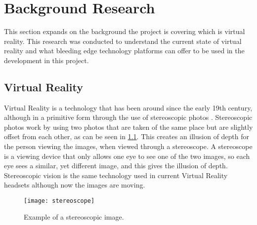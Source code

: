 \chapter{Background Research}
\label{chapter2}


This section expands on the background the project is covering which is virtual reality. This research was conducted to understand the current state of virtual reality and what bleeding edge technology platforms can offer to be used in the development in this project.

\section{Virtual Reality}
	Virtual Reality is a technology that has been around since the early 19th century, although in a primitive form through the use of stereoscopic photos \cite{stereoscopy}. Stereoscopic photos work by using two photos that are taken of the same place but are slightly offset from each other, as can be seen in \ref{fig:stereoscope1}. This creates an illusion of depth for the person viewing the images, when viewed through a stereoscope. A stereoscope is a viewing device that only allows one eye to see one of the two images, so each eye sees a similar, yet different image, and this gives the illusion of depth. Stereoscopic vision is the same technology used in current Virtual Reality headsets although now the images are moving.

\begin{figure}[h]
	\texttt{[image: stereoscope]}
	\centering
	\caption{Example of a stereoscopic image. \cite{leedsstereoscopic}}
	\label{fig:stereoscope1}
\end{figure}

